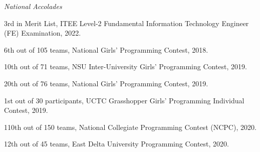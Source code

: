 \documentclass[11pt,letterpaper]{article}
\newcommand{\cvline}[1]{%
  \hspace*{1.55em}\parbox[t]{0.955\linewidth}{#1}\par
  \vspace{0.34em}%
}
\begin{document}
\vspace{0.3em}

\cvline{\textit{National Accolades}}

\cvline{3rd in Merit List, ITEE Level-2 Fundamental Information Technology Engineer (FE) Examination, 2022.}

\cvline{6th out of 105 teams, National Girls' Programming Contest, 2018.}

\cvline{10th out of 71 teams, NSU Inter-University Girls' Programming Contest, 2019.}

\cvline{20th out of 76 teams, National Girls' Programming Contest, 2019.}

\cvline{1st out of 30 participants, UCTC Grasshopper Girls' Programming Individual Contest, 2019.}

\cvline{110th out of 150 teams, National Collegiate Programming Contest (NCPC), 2020.}

\cvline{12th out of 45 teams, East Delta University Programming Contest, 2020.}

\end{document}
